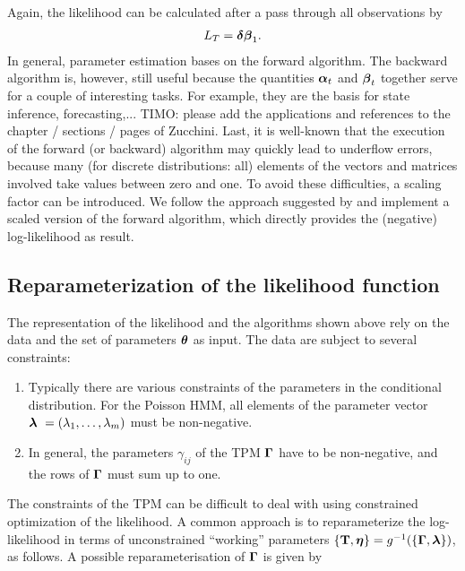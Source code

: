 \documentclass[bimj,fleqn]{w-art}\usepackage[]{graphicx}\usepackage[]{color}
\newcommand{\bct}{{\bf T}}
\newcommand{\bgamma}{\mbox{\boldmath $\Gamma$}}
\newcommand{\bfeta}{\mbox{\boldmath $\eta$}}
\newcommand{\btheta}{\mbox{\boldmath $\theta$}}
\newcommand{\balpha}{\mbox{\boldmath $\alpha$}}
\newcommand{\bfbeta}{\mbox{\boldmath $\beta$}}
\newcommand{\bfdelta}{\mbox{\boldmath $\delta$}}
\newcommand{\bflambda}{\mbox{\boldmath $\lambda$}}
\theoremstyle{plain}
\theoremstyle{definition}
\begin{document}
Again, the likelihood can be calculated after a pass through all observations by
\begin{gather*}
L_T = \bfdelta \bfbeta_1.
\end{gather*}
In general, parameter estimation bases on the forward algorithm. The backward algorithm is, however, still useful because the quantities $\balpha_t$ and $\bfbeta_t$ together serve for a couple of interesting tasks. For example, they are the basis for state inference, forecasting,... TIMO: please add the applications and references to the chapter / sections / pages of Zucchini. Last, it is well-known that the execution of the forward (or backward) algorithm may quickly lead to underflow errors, because many (for discrete distributions: all) elements of the vectors and matrices involved take values between zero and one. To avoid these difficulties, a scaling factor can be introduced. We follow the approach suggested by \citet[p. ~48]{zucchini} and implement a scaled version of the forward algorithm, which directly provides the (negative) log-likelihood as result.


\subsection{Reparameterization of the likelihood function}
\label{sec:hmm_repar}

The representation of the likelihood and the algorithms shown above rely on the data and the set of parameters $\btheta$ as input. The data are subject to several constraints:
\begin{enumerate}
\item Typically there are various constraints of the parameters in the conditional distribution. For the Poisson HMM, all elements of the parameter vector $\bflambda\ = (\lambda_1, \dots, \lambda_m)$ must be non-negative. 
\item In general, the parameters $\gamma_{ij}$ of the TPM $\bgamma$ have to be non-negative, and the rows of $\bgamma$ must sum up to one.
\end{enumerate}
The constraints of the TPM can be difficult to deal with using constrained optimization of the likelihood. A common approach is to reparameterize the log-likelihood in terms of unconstrained ``working'' parameters $\{\bct, \bfeta\}= g^{-1}(\{\bgamma, \bflambda\})$, as follows. A possible reparameterisation of $\bgamma$ is given by 
\end{document}

